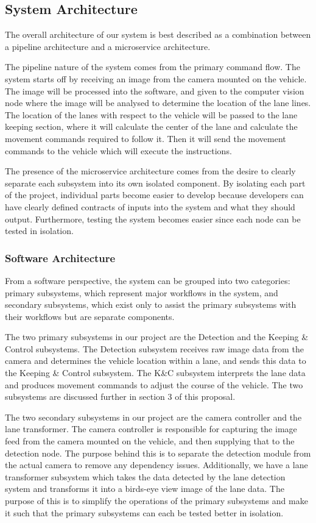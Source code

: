 \documentclass[titlepage]{article}
\begin{document}
\subsection{System Architecture}
The overall architecture of our system is best described as a combination between a pipeline architecture and a microservice architecture.

The pipeline nature of the system comes from the primary command flow. The system starts off by receiving an image from the camera mounted on the vehicle. The image will be processed into the software, and given to the computer vision node where the image will be analysed to determine the location of the lane lines. The location of the lanes with respect to the vehicle will be passed to the lane keeping section, where it will calculate the center of the lane and calculate the movement commands required to follow it. Then it will send the movement commands to the vehicle which will execute the instructions.

The presence of the microservice architecture comes from the desire to clearly separate each subsystem into its own isolated component. By isolating each part of the project, individual parts become easier to develop because developers can have clearly defined contracts of inputs into the system and what they should output. Furthermore, testing the system becomes easier since each node can be tested in isolation.

\subsubsection{Software Architecture}
From a software perspective, the system can be grouped into two categories: primary subsystems, which represent major workflows in the system, and secondary subsystems, which exist only to assist the primary subsystems with their workflows but are separate components.

The two primary subsystems in our project are the Detection and the Keeping \& Control subsystems. The Detection subsystem receives raw image data from the camera and determines the vehicle location within a lane, and sends this data to the Keeping \& Control subsystem. The K\&C subsystem interprets the lane data and produces movement commands to adjust the course of the vehicle. The two subsystems are discussed further in section 3 of this proposal.

The two secondary subsystems in our project are the camera controller and the lane transformer. The camera controller is responsible for capturing the image feed from the camera mounted on the vehicle, and then supplying that to the detection node. The purpose behind this is to separate the detection module from the actual camera to remove any dependency issues. Additionally, we have a lane transformer subsystem which takes the data detected by the lane detection system and transforms it into a birds-eye view image of the lane data. The purpose of this is to simplify the operations of the primary subsystems and make it such that the primary subsystems can each be tested better in isolation.
\end{document}
